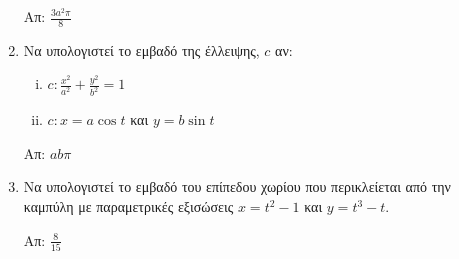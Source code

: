 \begin{enumerate}
        \hfill Απ: $ \frac{3 a^{2} \pi}{8} $ 

    \item Να υπολογιστεί το εμβαδό της έλλειψης, $c$ αν:
        \begin{enumerate}[i)]
            \item $ c: \frac{x^{2}}{a^{2}} + \frac{y^{2}}{b^{2}} = 1 $ 
            \item $ c: x = a \cos{t}$ και $ y = b \sin{t} $ 
        \end{enumerate}

                \hfill Απ: $ ab \pi $ 

    \item Να υπολογιστεί το εμβαδό του επίπεδου χωρίου που περικλείεται από την 
        καμπύλη με παραμετρικές εξισώσεις $ x = t^{2} - 1 $ και $ y = t^{3} - t $.

        \hfill Απ: $ \frac{8}{15} $ 

\end{enumerate}





